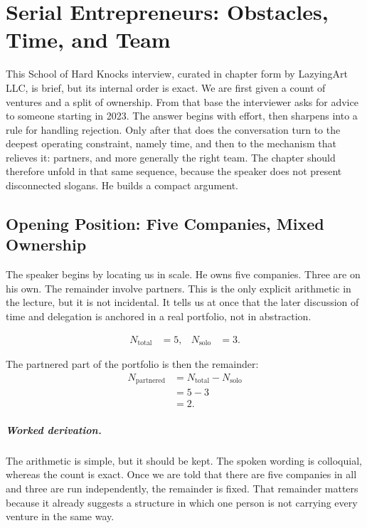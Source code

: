 \chapter{Serial Entrepreneurs: Obstacles, Time, and Team}

This School of Hard Knocks interview, curated in chapter form by LazyingArt LLC, is brief, but its internal order is exact. We are first given a count of ventures and a split of ownership. From that base the interviewer asks for advice to someone starting in 2023. The answer begins with effort, then sharpens into a rule for handling rejection. Only after that does the conversation turn to the deepest operating constraint, namely time, and then to the mechanism that relieves it: partners, and more generally the right team. The chapter should therefore unfold in that same sequence, because the speaker does not present disconnected slogans. He builds a compact argument.

\section{Opening Position: Five Companies, Mixed Ownership}

The speaker begins by locating us in scale. He owns five companies. Three are on his own. The remainder involve partners. This is the only explicit arithmetic in the lecture, but it is not incidental. It tells us at once that the later discussion of time and delegation is anchored in a real portfolio, not in abstraction.

\begin{align}
N_{\mathrm{total}} &= 5, &
N_{\mathrm{solo}} &= 3.
\end{align}

The partnered part of the portfolio is then the remainder:
\begin{align}
N_{\mathrm{partnered}}
  &= N_{\mathrm{total}} - N_{\mathrm{solo}} \\
  &= 5 - 3 \\
  &= 2.
\end{align}

\paragraph{Worked derivation.}
The arithmetic is simple, but it should be kept. The spoken wording is colloquial, whereas the count is exact. Once we are told that there are five companies in all and three are run independently, the remainder is fixed. That remainder matters because it already suggests a structure in which one person is not carrying every venture in the same way.

